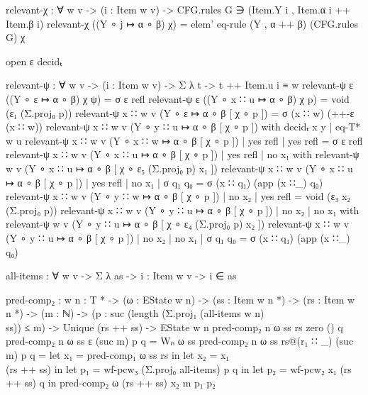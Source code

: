 {\begin{code}
			  relevant-χ : ∀ {w v} -> (i : Item w v) -> CFG.rules G ∋ (Item.Y i , Item.α i ++ Item.β i)
			  relevant-χ ((Y ∘ j ↦ α ∘ β) {χ}) = elem' eq-rule (Y , α ++ β) (CFG.rules G) χ

			  open ε decidₜ

			  relevant-ψ : ∀ {w v} -> (i : Item w v) -> Σ λ t -> t ++ Item.u i ≡ w
			  relevant-ψ {ε} ((Y ∘ ε ↦ α ∘ β) {χ} {ψ}) = σ ε refl
			  relevant-ψ {ε} ((Y ∘ x ∷ u ↦ α ∘ β) {χ} {p}) = void (ε₁ (Σ.proj₀ p))
			  relevant-ψ {x ∷ w} {v} (Y ∘ ε ↦ α ∘ β [ χ ∘ p ]) = σ (x ∷ w) (++-ε (x ∷ w))
			  relevant-ψ {x ∷ w} {v} (Y ∘ y ∷ u ↦ α ∘ β [ χ ∘ p ]) with decidₜ x y | eq-T* w u
			  relevant-ψ {x ∷ w} {v} (Y ∘ x ∷ w ↦ α ∘ β [ χ ∘ p ]) | yes refl | yes refl = σ ε refl
			  relevant-ψ {x ∷ w} {v} (Y ∘ x ∷ u ↦ α ∘ β [ χ ∘ p ]) | yes refl | no x₁ with relevant-ψ {w} {v} (Y ∘ x ∷ u ↦ α ∘ β [ χ ∘ ε₅ (Σ.proj₀ p) x₁ ])
			  relevant-ψ {x ∷ w} {v} (Y ∘ x ∷ u ↦ α ∘ β [ χ ∘ p ]) | yes refl | no x₁ | σ q₁ q₀ = σ (x ∷ q₁) (app (x ∷_) q₀)
			  relevant-ψ {x ∷ w} {v} (Y ∘ y ∷ w ↦ α ∘ β [ χ ∘ p ]) | no x₂    | yes refl = void (ε₃ x₂ (Σ.proj₀ p))
			  relevant-ψ {x ∷ w} {v} (Y ∘ y ∷ u ↦ α ∘ β [ χ ∘ p ]) | no x₂    | no x₁ with relevant-ψ {w} {v} (Y ∘ y ∷ u ↦ α ∘ β [ χ ∘ ε₄ (Σ.proj₀ p) x₂ ])
			  relevant-ψ {x ∷ w} {v} (Y ∘ y ∷ u ↦ α ∘ β [ χ ∘ p ]) | no x₂    | no x₁ | σ q₁ q₀ = σ (x ∷ q₁) (app (x ∷_) q₀)

		\end{code}}
		\begin{code}
			  all-items : ∀ {w} {v} -> Σ λ as -> {i : Item w v} -> i ∈ as
		\end{code}

		\begin{code}
			  pred-comp₂ : {w n : T *} ->
			    (ω : EState w n) ->
			    (ss : Item w n *) ->
			    (rs : Item w n *) ->
			    (m : ℕ) ->
			    (p : suc (length (Σ.proj₁ (all-items {w} {n}) \\ ss)) ≤ m) ->
			    Unique (rs ++ ss) ->
			    EState w n
			  pred-comp₂ {n} ω ss rs zero () q
			  pred-comp₂ {n} ω ss ε (suc m) p q = Wₙ ω ss
			  pred-comp₂ {n} ω ss rs@(r₁ ∷ _) (suc m) p q =
			    let x₁ = pred-comp₁ ω ss rs in
			    let x₂ = x₁ \\ (rs ++ ss) in
			    let p₁ = wf-pcw₃ (Σ.proj₀ all-items) p q in
			    let p₂ = wf-pcw₂ x₁ (rs ++ ss) q in
			    pred-comp₂ ω (rs ++ ss) x₂ m p₁ p₂
		\end{code}

